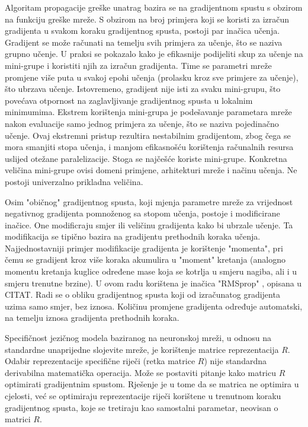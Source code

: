 \documentclass[times, utf8, diplomski, numeric]{fer}
\begin{document}
Algoritam propagacije greške unatrag bazira se na gradijentnom spustu s obzirom na funkciju greške mreže. S obzirom na broj primjera koji se koristi za izračun gradijenta u svakom koraku gradijentnog spusta, postoji par inačica učenja. Gradijent se može računati na temelju svih primjera za učenje, što se naziva grupno  učenje. U praksi se pokazalo kako je efikasnije podijeliti skup za učenje na mini-grupe  i koristiti njih za izračun gradijenta. Time se parametri mreže promjene više puta u svakoj epohi učenja (prolasku kroz sve primjere za učenje), što ubrzava učenje. Istovremeno, gradijent nije isti za svaku mini-grupu, što povećava otpornost na zaglavljivanje gradijentnog spusta u lokalnim minimumima. Ekstrem korištenja mini-grupa je podešavanje parametara mreže nakon evaluacije samo jednog primjera za učenje, što se naziva pojedinačno  učenje. Ovaj ekstremni pristup rezultira nestabilnim gradijentom, zbog čega se mora smanjiti stopa učenja, i manjom efikasnošću korištenja računalnih resursa uslijed otežane paralelizacije. Stoga se najčešće koriste mini-grupe. Konkretna veličina mini-grupe ovisi domeni primjene, arhitekturi mreže i načinu učenja. Ne postoji univerzalno prikladna veličina.

Osim "običnog" gradijentnog spusta, koji mjenja parametre mreže za vrijednost negativnog gradijenta pomnoženog sa stopom učenja, postoje i modificirane inačice. One modificraju smjer ili veličinu gradijenta kako bi ubrzale učenje. Ta modifikacija se tipično bazira na gradijentu prethodnih koraka učenja. Najjednostavniji primjer modifikacije gradijenta je korištenje "momenta", pri čemu se gradijent kroz više koraka akumulira u "moment" kretanja (analogno momentu kretanja kuglice određene mase koja se kotrlja u smjeru nagiba, ali i u smjeru trenutne brzine). U ovom radu korištena je inačica "RMSprop" , opisana u CITAT. Radi se o obliku gradijentnog spusta koji od izračunatog gradijenta uzima samo smjer, bez iznosa. Količinu promjene gradijenta određuje automatski, na temelju iznosa gradijenta prethodnih koraka.

Specifičnost jezičnog modela baziranog na neuronskoj mreži, u odnosu na standardne unaprijedne slojevite mreže, je korištenje matrice reprezentacija $R$. Odabir reprezentacije specifične riječi (retka matrice $R$) nije standardna derivabilna matematička operacija. Može se postaviti pitanje kako matricu $R$ optimirati gradijentnim spustom. Rješenje je u tome da se matrica ne optimira u cjelosti, već se optimiraju reprezentacije riječi korištene u trenutnom koraku gradijentnog spusta, koje se tretiraju kao samostalni parametar, neovisan o matrici $R$.
\end{document}
